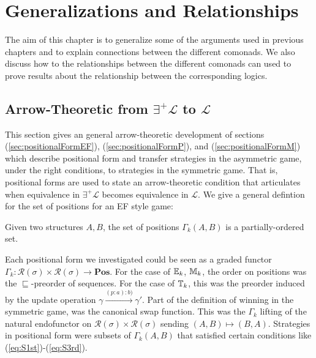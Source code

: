\chapter{Generalizations and Relationships}
The aim of this chapter is to generalize some of the arguments used in previous chapters and to explain connections between the different comonads. We also discuss how to the relationships between the different comonads can used to prove results about the relationship between the corresponding logics. 
\section{Arrow-Theoretic from $\exists^{+}\mathcal{L}$ to $\mathcal{L}$}
This section gives an general arrow-theoretic development of sections (\ref{sec:positionalFormEF}), (\ref{sec:positionalFormP}), and (\ref{sec:positionalFormM}) which describe positional form and transfer strategies in the asymmetric game, under the right conditions, to strategies in the symmetric game. That is, positional forms are used to state an arrow-theoretic condition that articulates when equivalence in $\exists^{+}\mathcal{L}$ becomes equivalence in $\mathcal{L}$. We give a general defintion for the set of positions for an EF style game:
\begin{defn}
Given two structures $A,B$, the set of positions $\Gamma_{k}(A,B)$ is a partially-ordered set. 
\end{defn}
Each positional form we investigated could be seen as a graded functor $\Gamma_{k}:\mathcal{R}(\sigma) \times \mathcal{R}(\sigma) \longrightarrow \textbf{Pos}$. For the case of ${\mathbb{E}_{k}}$, ${\mathbb{M}_{k}}$, the order on positions was the $\sqsubseteq$-preorder of sequences. For the case of ${\mathbb{T}_{k}}$, this was the preorder induced by the update operation $\gamma \xrightarrow{(p:a):b)} \gamma'$. Part of the definition of winning in the symmetric game, was the canonical swap function. This was the $\Gamma_{k}$ lifting of the natural endofunctor on $\mathcal{R}(\sigma) \times \mathcal{R}(\sigma)$ sending $(A,B) \mapsto (B,A)$. Strategies in positional form were subsets of $\Gamma_{k}(A,B)$ that satisfied certain conditions like (\ref{eq:S1st})-(\ref{eq:S3rd}). \\~\\
